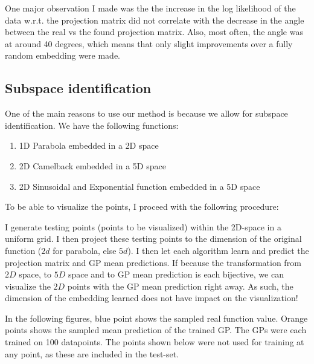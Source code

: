  One major observation I made was the the increase in the log likelihood of the data w.r.t. the projection matrix did not correlate with the decrease in the angle between the real vs the found projection matrix.
 Also, most often, the angle was at around 40 degrees, which means that only slight improvements over a fully random embedding were made.


\subsection{Subspace identification}
One of the main reasons to use our method is because we allow for subspace identification.
We have the following functions:

\begin{enumerate}
\item 1D Parabola embedded in a 2D space
\item 2D Camelback embedded in a 5D space
\item 2D Sinusoidal and Exponential function embedded in a 5D space
\end{enumerate}

To be able to visualize the points, I proceed with the following procedure:

I generate testing points (points to be visualized) within the 2D-space in a uniform grid.
I then project these testing points to the dimension of the original function ($2d$ for parabola, else $5d$).
I then let each algorithm learn and predict the projection matrix and GP mean predictions.
If because the transformation from $2D$ space, to $5D$ space and to GP mean prediction is each bijective, we can visualize the $2D$ points with the GP mean prediction right away.
As such, the dimension of the embedding learned does not have impact on the visualization!

In the following figures, blue point shows the sampled real function value.
Orange points shows the sampled mean prediction of the trained GP.
The GPs were each trained on 100 datapoints. 
The points shown below were not used for training at any point, as these are included in the test-set.

